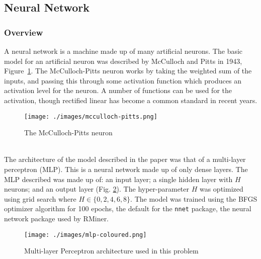 \documentclass[12pt,a4paper,titlepage,twoside]{report}
\begin{document}
\subsection{Neural Network}

\subsubsection*{Overview}
	A neural network is a machine made up of many artificial neurons. The basic model for an artificial neuron was described by McCulloch and Pitts in 1943\cite{mcculloch-pitts-neuron}, Figure~\ref{fig:m-p-neuron}. The McCulloch-Pitts neuron works by taking the weighted sum of the inputs, and passing this through some activation function which produces an activation level for the neuron. A number of functions can be used for the activation, though rectified linear has become a common standard in recent years\cite{relu-activation}.
	\begin{figure}[h]
  		\centering
  		\texttt{[image: ./images/mcculloch-pitts.png]}
		\caption{The McCulloch-Pitts neuron}
		\label{fig:m-p-neuron}
	\end{figure}\\
	The architecture of the model described in the paper was that of a multi-layer perceptron (MLP). This is a neural network made up of only dense layers\cite{intro-to-nn}. The MLP described was made up of: an input layer; a single hidden layer with $H$ neurons; and an output layer (Fig. \ref{fig:mlp-fig}). The hyper-parameter $H$ was optimized using grid search where $H \in \{0, 2, 4, 6, 8\}$. The model was trained using the BFGS\cite{bfgs} optimizer algorithm for 100 epochs, the default for the \texttt{nnet} package, the neural network package used by RMiner.
	\begin{figure}[h]
		\centering
		\texttt{[image: ./images/mlp-coloured.png]}
		\caption{Multi-layer Perceptron architecture used in this problem}
		\label{fig:mlp-fig}
	\end{figure}
	
\end{document}
